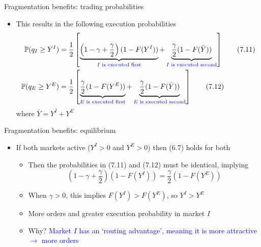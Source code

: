 \documentclass[english,10pt
,aspectratio=169
]{beamer}
\begin{document}
\begin{frame}{Fragmentation benefits: trading probabilities}
\begin{itemize}
\item This results in the following execution probabilities
\begin{align}
\mathbb{P}(q_I \geq Y^I) & = \frac{1}{2} \left[\underbrace{\left(1-\gamma+\frac{\gamma}{2} \right) (1-F(Y^I))}_{\textcolor{blue}{\text{$I$ is executed first}}} + \underbrace{\frac{\gamma}{2}(1-F(\bar{Y}))}_{\textcolor{blue}{\text{$I$ is executed second}}}\right] \tag{7.11} \\
\mathbb{P}(q_E \geq Y^E) & = \frac{1}{2} \left[\underbrace{\frac{\gamma}{2} (1-F(Y^E))}_{\textcolor{blue}{\text{$E$ is executed first}}} + \underbrace{\frac{\gamma}{2}(1-F(\bar{Y}))}_{\textcolor{blue}{\text{$E$ is executed second}}}\right] \tag{7.12}
\end{align}
where $\bar{Y}=Y^I+Y^E$
\end{itemize}
\end{frame}


\begin{frame}{Fragmentation benefits: equilibrium}
\begin{itemize}
\item If both markets active ($Y^I>0$ and $Y^E>0$) then (6.7) holds for both
\begin{itemize}
\item Then the probabilities in (7.11) and (7.12) must be identical, implying
\[
\left(1-\gamma + \frac{\gamma}{2}\right)(1-F(Y^I)) = \frac{\gamma}{2}(1-F(Y^E))
\]
\item When $\gamma >0$, this implies $F(Y^I) > F(Y^E)$, so $Y^I > Y^E$
\item More orders and greater execution probability in market $I$
\item Why? 
\pause
\textcolor{blue}{Market $I$ has an `routing advantage', meaning it is more attractive $\rightarrow$ more orders}
\end{itemize}
\end{itemize}
\end{frame}
\end{document}
